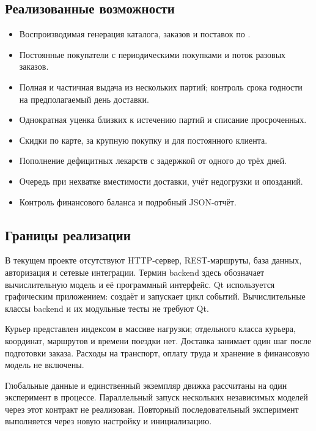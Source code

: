 \subsection{Реализованные возможности}
\begin{itemize}
  \item Воспроизводимая генерация каталога, заказов и поставок по .
  \item Постоянные покупатели с периодическими покупками и поток разовых заказов.
  \item Полная и частичная выдача из нескольких партий; контроль срока годности
        на предполагаемый день доставки.
  \item Однократная уценка близких к истечению партий и списание просроченных.
  \item Скидки по карте, за крупную покупку и для постоянного клиента.
  \item Пополнение дефицитных лекарств с задержкой от одного до трёх дней.
  \item Очередь при нехватке вместимости доставки, учёт недогрузки и опозданий.
  \item Контроль финансового баланса и подробный JSON-отчёт.
\end{itemize}

\subsection{Границы реализации}
В текущем проекте отсутствуют HTTP-сервер, REST-маршруты, база данных,
авторизация и сетевые интеграции. Термин backend здесь обозначает вычислительную
модель и её программный интерфейс. Qt используется графическим приложением:
 создаёт  и запускает цикл событий.
Вычислительные классы backend и их модульные тесты не требуют Qt.

Курьер представлен индексом в массиве нагрузки; отдельного класса курьера,
координат, маршрутов и времени поездки нет. Доставка занимает один шаг после
подготовки заказа. Расходы на транспорт, оплату труда и хранение в финансовую
модель не включены.

Глобальные данные и единственный экземпляр движка рассчитаны на один эксперимент
в процессе. Параллельный запуск нескольких независимых моделей через этот
контракт не реализован. Повторный последовательный эксперимент выполняется
через новую настройку и инициализацию.
